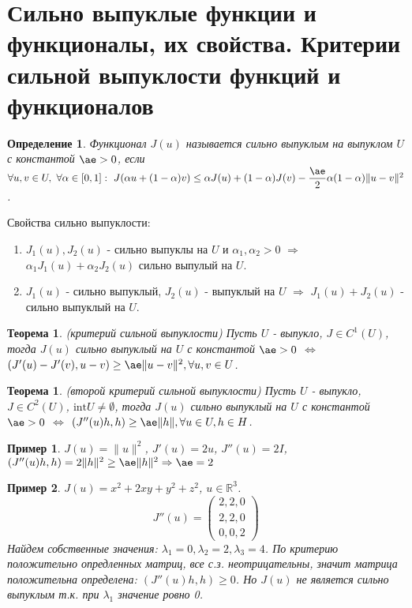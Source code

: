 \documentclass[9pt, a4paper]{extarticle}
\newtheorem*{theorem*}{Теорема}
\newtheorem*{theorem}{Теорема}
\newtheorem*{definition}{Определение}
\newtheorem*{sample}{Пример}
\begin{document}
\section{Сильно выпуклые функции и функционалы, их свойства. Критерии сильной выпуклости функций и функционалов}
	\begin{definition}
		Функционал $J(u)$ называется сильно выпуклым на выпуклом $U$ с константой $\ae > 0$, если $\forall u, v \in U, \ \forall \alpha \in [0,1]: \ J(\alpha u + (1-\alpha)v) \leq  \alpha J(u) + (1-\alpha) J(v) - \dfrac\ae2 \alpha(1-\alpha) \|u-v\|^2$.
	\end{definition}
		Свойства сильно выпуклости:
	\begin{enumerate}
		\item $J_1(u), J_2(u)$ - сильно выпуклы на $U$ и $\alpha_1, \alpha_2 >0$ $\Rightarrow$ $\alpha_1 J_1(u) + \alpha_2 J_2(u)$ сильно выпулый на $U$. 
		\item $J_1(u)$ - сильно выпуклый, $J_2(u)$ - выпуклый на $U$ $\Rightarrow$ $J_1(u) + J_2(u)$ - сильно выпуклый на $U$. 
	\end{enumerate}
	\begin{theorem}
		(критерий сильной выпуклости)\newline
		Пусть $U$ - выпукло, $J \in C^1(U)$, тогда $J(u)$ сильно выпуклый на $U$ с константой $\ae > 0$ $\Leftrightarrow$ $(J'(u) - J'(v), u -v) \geq \ae \|u - v\|^2, \forall u, v \in U$. 		
	\end{theorem}
	\begin{theorem*}
		(второй критерий сильной выпуклости)\newline
		Пусть $U$ - выпукло, $J \in C^2(U)$, $\text{int} U \neq \emptyset$, тогда $J(u)$ сильно выпуклый на $U$ с константой $\ae > 0$ $\Leftrightarrow$ $(J''(u)h, h)\geq \ae\|h\|, \forall u \in U, h \in H$.
	\end{theorem*}
	\begin{sample}
		$J(u) = \|u\|^2$, $J'(u) = 2u$, $J''(u)= 2I$, $(J''(u)h, h) =  2 \|h\|^2 \geq \ae \|h\|^2 \Rightarrow \ae = 2$ 
	\end{sample}
	\begin{sample}
		$J(u) = x^2 + 2xy + y^2 + z^2$, $u \in \mathbb{R}^3$.
		\begin{equation*}
			J''(u) = \left(\begin{matrix}
				2,2,0\\
				2,2,0\\
				0,0,2
			\end{matrix} \right)
		\end{equation*}
		Найдем собственные значения: $\lambda_1 = 0, \lambda_2 = 2, \lambda_3 = 4$. По критерию положительно опредленных матриц, все с.з. неотрицательны, значит матрица положительна определена: $(J''(u)h, h) \geq 0$. Но $J(u)$ не является сильно выпуклым т.к. при $\lambda_1$ значение ровно 0. 
	\end{sample}
	
\end{document}
